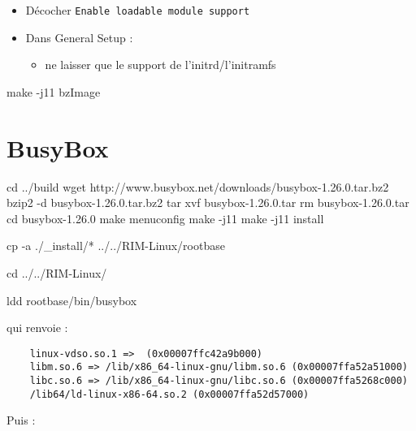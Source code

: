 \documentclass[]{article}
\newenvironment{Shaded}{}{}
\newcommand{\FunctionTok}[1]{\textcolor[rgb]{0.02,0.16,0.49}{{#1}}}
\newcommand{\BuiltInTok}[1]{{#1}}
\newcommand{\NormalTok}[1]{{#1}}
\providecommand{\tightlist}{%
  \setlength{\itemsep}{0pt}\setlength{\parskip}{0pt}}
\begin{document}
\begin{itemize}
\item
  Décocher \texttt{Enable\ loadable\ module\ support}
\item
  Dans General Setup :

  \begin{itemize}
  \tightlist
  \item
    ne laisser que le support de l'initrd/l'initramfs
  \end{itemize}
\end{itemize}

\begin{Shaded}
\begin{Highlighting}[]
\FunctionTok{make} \NormalTok{-j11 bzImage}
\end{Highlighting}
\end{Shaded}

\section{BusyBox}\label{busybox}

\begin{Shaded}
\begin{Highlighting}[]
\BuiltInTok{cd} \NormalTok{../build}
\FunctionTok{wget} \NormalTok{http://www.busybox.net/downloads/busybox-1.26.0.tar.bz2}
\FunctionTok{bzip2} \NormalTok{-d busybox-1.26.0.tar.bz2}
\FunctionTok{tar} \NormalTok{xvf busybox-1.26.0.tar}
\FunctionTok{rm} \NormalTok{busybox-1.26.0.tar}
\BuiltInTok{cd} \NormalTok{busybox-1.26.0}
\FunctionTok{make} \NormalTok{menuconfig}
\FunctionTok{make} \NormalTok{-j11}
\FunctionTok{make} \NormalTok{-j11 install}

\FunctionTok{cp} \NormalTok{-a ./_install/* ../../RIM-Linux/rootbase}

\BuiltInTok{cd} \NormalTok{../../RIM-Linux/}


\FunctionTok{ldd} \NormalTok{rootbase/bin/busybox}
\end{Highlighting}
\end{Shaded}

qui renvoie :

\begin{verbatim}
    linux-vdso.so.1 =>  (0x00007ffc42a9b000)
    libm.so.6 => /lib/x86_64-linux-gnu/libm.so.6 (0x00007ffa52a51000)
    libc.so.6 => /lib/x86_64-linux-gnu/libc.so.6 (0x00007ffa5268c000)
    /lib64/ld-linux-x86-64.so.2 (0x00007ffa52d57000)
\end{verbatim}

Puis :
\end{document}
